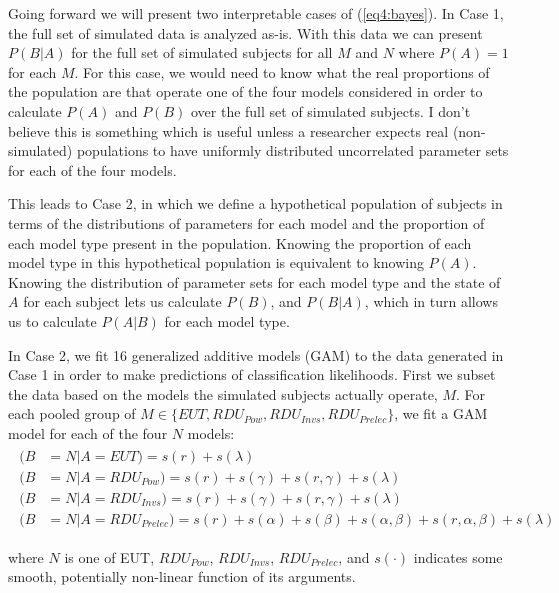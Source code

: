 \documentclass[../main.tex]{subfiles}
\begin{document}
Going forward we will present two interpretable cases of (\ref{eq4:bayes}).
In Case 1, the full set of simulated data is analyzed as-is.
With this data we can present $P(B|A)$ for the full set of simulated subjects for all $M$ and $N$ where $P(A) = 1$ for each $M$.
For this case, we would need to know what the real proportions of the population are that operate one of the four models considered in order to calculate $P(A)$ and $P(B)$ over the full set of simulated subjects.
I don't believe this is something which is useful unless a researcher expects real (non-simulated) populations to have uniformly distributed uncorrelated parameter sets for each of the four models.

This leads to Case 2, in which we define a hypothetical population of subjects in terms of the distributions of parameters for each model and the proportion of each model type present in the population.
Knowing the proportion of each model type in this hypothetical population is equivalent to knowing $P(A)$.
Knowing the distribution of parameter sets for each model type and the state of $A$ for each subject lets us calculate $P(B)$, and $P(B|A)$, which in turn allows us to calculate $P(A|B)$ for each model type.

In Case 2, we fit 16 generalized additive models (GAM) \parencite{Hastie1986} to the data generated in Case 1 in order to make predictions of classification likelihoods.
First we subset the data based on the models the simulated subjects actually operate, $M$.
For each pooled group of $M \in \lbrace \textit{EUT}, \mathit{RDU_{Pow}}, \mathit{RDU_{Invs}}, \mathit{RDU_{Prelec}} \rbrace$, we fit a GAM model for each of the four $N$ models:
\begin{align}
	\label{eq4:GAM}
	\begin{split}
		(B &= N | A = EUT)                   = s(r) + s(\lambda)\\
		(B &= N | A = \mathit{RDU_{Pow}})    = s(r) + s(\gamma) + s(r, \gamma) + s(\lambda)\\
		(B &= N | A = \mathit{RDU_{Invs}})   = s(r) + s(\gamma) + s(r, \gamma) + s(\lambda)\\
		(B &= N | A = \mathit{RDU_{Prelec}}) = s(r) + s(\alpha) + s(\beta) +s(\alpha, \beta) + s(r, \alpha, \beta) + s(\lambda)
	\end{split}
\end{align}

\noindent where $N$ is one of EUT, $\mathit{RDU_{Pow}}$, $\mathit{RDU_{Invs}}$, $\mathit{RDU_{Prelec}}$, and $s(\cdot)$ indicates some smooth, potentially non-linear function of its arguments.
\end{document}
